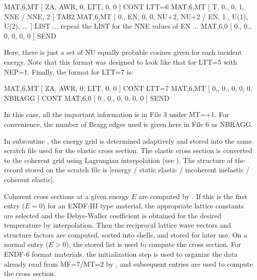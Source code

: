 \small
\begin{ccode}

   MAT,6,MT [ ZA, AWR, 0, LTT, 0, 0 ] CONT  LTT=6
   MAT,6,MT [ T, 0., 0, 1, NNE / NNE, 2 ] TAB2
   MAT,6,MT [ 0., EN, 0, 0, NU+2, NU+2 /
              EN, 1., U(1), U(2), ... ] LIST
      ... repeat the LIST for the NNE values of EN ...
   MAT,6,0  [ 0., 0., 0, 0, 0, 0 ] SEND

\end{ccode}
\normalsize

\noindent
Here, there is just a set of NU equally probable cosines given
for each incident energy.  Note that this format was designed to
look like that for LTT=5 with NEP=1.
Finally, the format for LTT=7 is:

\small
\begin{ccode}

   MAT,6,MT [ ZA, AWR, 0, LTT, 0, 0 ] CONT  LTT=7
   MAT,6,MT [ 0,, 0., 0, 0, 0, NBRAGG ] CONT
   MAT,6,0  [ 0., 0., 0, 0, 0, 0 ] SEND

\end{ccode}
\normalsize

\noindent
In this case, all the important information is in File 3 under
MT=+1.  For convenience, the number of Bragg edges
used is given here in File 6 as NBRAGG.

In subroutine , the energy grid
is determined adaptively and stored into the same 
 scratch file used for
the elastic cross section.  The elastic cross section is converted to
the coherent grid using Lagrangian interpolation (see ).
 The structure of the record stored on the
scratch file is [energy / static elastic / incoherent inelastic
/ coherent elastic].

Coherent cross sections at a given energy $E$ are computed by
.  If this is the first
entry ($E{=}0$) for an ENDF-III type material, the appropriate
lattice constants are selected and the Debye-Waller coefficient
is obtained for the desired temperature by interpolation.  Then
the reciprocal lattice wave vectors and structure factors are
computed, sorted into shells, and stored for later use.  On
a normal entry ($E{>}0$), the stored list is used to
compute the cross section.  For ENDF-6 format materials, the
initialization step is used to organize the data already read
from MF=7/MT=2 by , and subsequent entries are used
to compute the cross section.

